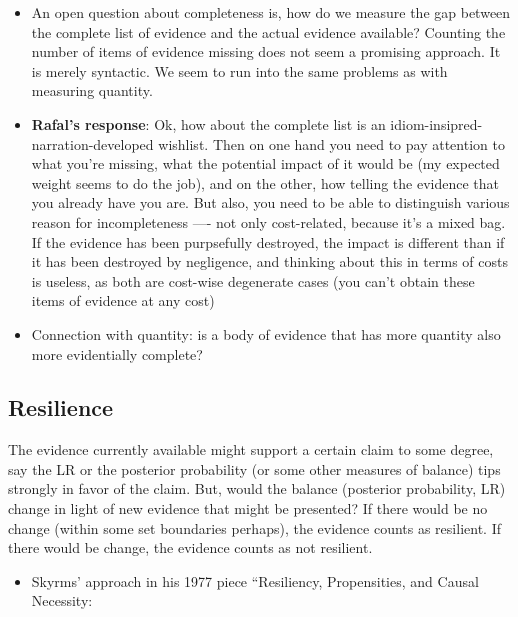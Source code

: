 \documentclass[
  10pt,
  dvipsnames,enabledeprecatedfontcommands]{scrartcl}
\providecommand{\tightlist}{%
  \setlength{\itemsep}{0pt}\setlength{\parskip}{0pt}}
\begin{document}
\begin{itemize}
\item
  An open question about completeness is, how do we measure the gap
  between the complete list of evidence and the actual evidence
  available? Counting the number of items of evidence missing does not
  seem a promising approach. It is merely syntactic. We seem to run into
  the same problems as with measuring quantity.
\item
  \textbf{Rafal's response}: Ok, how about the complete list is an
  idiom-insipred-narration-developed wishlist. Then on one hand you need
  to pay attention to what you're missing, what the potential impact of
  it would be (my expected weight seems to do the job), and on the
  other, how telling the evidence that you already have you are. But
  also, you need to be able to distinguish various reason for
  incompleteness ---- not only cost-related, because it's a mixed bag.
  If the evidence has been purpsefully destroyed, the impact is
  different than if it has been destroyed by negligence, and thinking
  about this in terms of costs is useless, as both are cost-wise
  degenerate cases (you can't obtain these items of evidence at any
  cost)
\item
  Connection with quantity: is a body of evidence that has more quantity
  also more evidentially complete?
\end{itemize}


\hypertarget{resilience}{%
\subsection{Resilience}\label{resilience}}


The evidence currently available might support a certain claim to some
degree, say the LR or the posterior probability (or some other measures
of balance) tips strongly in favor of the claim. But, would the balance
(posterior probability, LR) change in light of new evidence that might
be presented? If there would be no change (within some set boundaries
perhaps), the evidence counts as resilient. If there would be change,
the evidence counts as not resilient.

\begin{itemize}
\tightlist
\item
  Skyrms' approach in his 1977 piece ``Resiliency, Propensities, and
  Causal Necessity:
\end{itemize}
\end{document}
